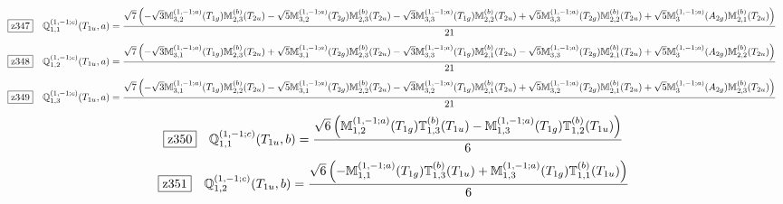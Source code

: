 \documentclass[fleqn,10pt,landscape]{jsarticle}
\begin{document}
\begin{dmath*}
\hspace*{3mm}\fbox{z347}\quad \mathbb{Q}_{1,1}^{(1,-1;c)}(T_{1u},a)=\frac{\sqrt{7} \left(- \sqrt{3} \mathbb{M}_{3,2}^{(1,-1;a)}(T_{1g}) \mathbb{M}_{2,3}^{(b)}(T_{2u}) - \sqrt{5} \mathbb{M}_{3,2}^{(1,-1;a)}(T_{2g}) \mathbb{M}_{2,3}^{(b)}(T_{2u}) - \sqrt{3} \mathbb{M}_{3,3}^{(1,-1;a)}(T_{1g}) \mathbb{M}_{2,2}^{(b)}(T_{2u}) + \sqrt{5} \mathbb{M}_{3,3}^{(1,-1;a)}(T_{2g}) \mathbb{M}_{2,2}^{(b)}(T_{2u}) + \sqrt{5} \mathbb{M}_{3}^{(1,-1;a)}(A_{2g}) \mathbb{M}_{2,1}^{(b)}(T_{2u})\right)}{21}
\end{dmath*}
\begin{dmath*}
\hspace*{3mm}\fbox{z348}\quad \mathbb{Q}_{1,2}^{(1,-1;c)}(T_{1u},a)=\frac{\sqrt{7} \left(- \sqrt{3} \mathbb{M}_{3,1}^{(1,-1;a)}(T_{1g}) \mathbb{M}_{2,3}^{(b)}(T_{2u}) + \sqrt{5} \mathbb{M}_{3,1}^{(1,-1;a)}(T_{2g}) \mathbb{M}_{2,3}^{(b)}(T_{2u}) - \sqrt{3} \mathbb{M}_{3,3}^{(1,-1;a)}(T_{1g}) \mathbb{M}_{2,1}^{(b)}(T_{2u}) - \sqrt{5} \mathbb{M}_{3,3}^{(1,-1;a)}(T_{2g}) \mathbb{M}_{2,1}^{(b)}(T_{2u}) + \sqrt{5} \mathbb{M}_{3}^{(1,-1;a)}(A_{2g}) \mathbb{M}_{2,2}^{(b)}(T_{2u})\right)}{21}
\end{dmath*}
\begin{dmath*}
\hspace*{3mm}\fbox{z349}\quad \mathbb{Q}_{1,3}^{(1,-1;c)}(T_{1u},a)=\frac{\sqrt{7} \left(- \sqrt{3} \mathbb{M}_{3,1}^{(1,-1;a)}(T_{1g}) \mathbb{M}_{2,2}^{(b)}(T_{2u}) - \sqrt{5} \mathbb{M}_{3,1}^{(1,-1;a)}(T_{2g}) \mathbb{M}_{2,2}^{(b)}(T_{2u}) - \sqrt{3} \mathbb{M}_{3,2}^{(1,-1;a)}(T_{1g}) \mathbb{M}_{2,1}^{(b)}(T_{2u}) + \sqrt{5} \mathbb{M}_{3,2}^{(1,-1;a)}(T_{2g}) \mathbb{M}_{2,1}^{(b)}(T_{2u}) + \sqrt{5} \mathbb{M}_{3}^{(1,-1;a)}(A_{2g}) \mathbb{M}_{2,3}^{(b)}(T_{2u})\right)}{21}
\end{dmath*}
\begin{dmath*}
\hspace*{3mm}\fbox{z350}\quad \mathbb{Q}_{1,1}^{(1,-1;c)}(T_{1u},b)=\frac{\sqrt{6} \left(\mathbb{M}_{1,2}^{(1,-1;a)}(T_{1g}) \mathbb{T}_{1,3}^{(b)}(T_{1u}) - \mathbb{M}_{1,3}^{(1,-1;a)}(T_{1g}) \mathbb{T}_{1,2}^{(b)}(T_{1u})\right)}{6}
\end{dmath*}
\begin{dmath*}
\hspace*{3mm}\fbox{z351}\quad \mathbb{Q}_{1,2}^{(1,-1;c)}(T_{1u},b)=\frac{\sqrt{6} \left(- \mathbb{M}_{1,1}^{(1,-1;a)}(T_{1g}) \mathbb{T}_{1,3}^{(b)}(T_{1u}) + \mathbb{M}_{1,3}^{(1,-1;a)}(T_{1g}) \mathbb{T}_{1,1}^{(b)}(T_{1u})\right)}{6}
\end{dmath*}
\end{document}
